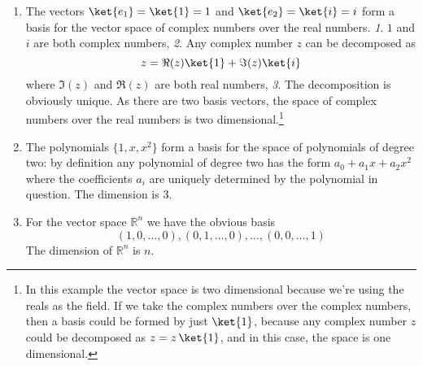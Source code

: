 \begin{enumerate}
\item The vectors $\ket{e_1} = \ket{1} = 1$ and $\ket{e_2} = \ket{i} = i$ form a basis for the vector space of complex numbers over the real numbers.
\emph{1}. $1$ and $i$ are both complex numbers, \emph{2}. Any complex number $z$ can be decomposed as
\begin{displaymath}
z = \Re(z) \ket{1} + \Im(z) \ket{i}
\end{displaymath}
where $\Im(z)$ and $\Re(z)$ are both real numbers, \emph{3}. The decomposition is obviously unique.
As there are two basis vectors, the space of complex numbers over the real numbers is two dimensional.\footnote{In this example the vector space is two dimensional because we're using the reals as the field.
If we take the complex numbers over the complex numbers, then a basis could be formed by just $\ket{1}$, because any complex number $z$ could be decomposed as $z = z\,\ket{1}$, and in this case, the space is one dimensional.}
\item The polynomials $\{1, x,x^{2}\}$ form a basis for the space of polynomials of degree two: by definition any polynomial of degree two has the form $a_0 + a_1 x + a_2 x^2$ where the coefficients $a_i$ are uniquely determined by the polynomial in question.
The dimension is 3.
\item For the vector space $\mathbb{R}^n$ we have the obvious basis
\begin{displaymath}
(1,0,\ldots ,0), (0,1,\ldots ,0), \ldots , (0,0,\ldots ,1)
\end{displaymath}
The dimension of $\mathbb{R}^n$ is $n$.
\end{enumerate}

